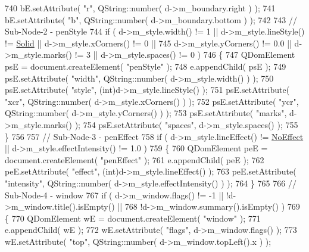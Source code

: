 \begin{DoxyCode}
740     bE.setAttribute( \textcolor{stringliteral}{"r"}, QString::number( d->m\_boundary.right ) );
741     bE.setAttribute( \textcolor{stringliteral}{"b"}, QString::number( d->m\_boundary.bottom ) );
742 
743     \textcolor{comment}{// Sub-Node-2 - penStyle}
744     \textcolor{keywordflow}{if} ( d->m\_style.width() != 1 || d->m\_style.lineStyle() != \hyperlink{classOkular_1_1Annotation_ac60f5de2d449043f9f849f3f081f8a7aabd593eeaf0fb9140018ea50a9d0bb80b}{Solid} || d->m\_style.xCorners() != 0 ||
745          d->m\_style.yCorners() != 0.0 || d->m\_style.marks() != 3 || d->m\_style.spaces() != 0 )
746     \{
747         QDomElement psE = document.createElement( \textcolor{stringliteral}{"penStyle"} );
748         e.appendChild( psE );
749         psE.setAttribute( \textcolor{stringliteral}{"width"}, QString::number( d->m\_style.width() ) );
750         psE.setAttribute( \textcolor{stringliteral}{"style"}, (\textcolor{keywordtype}{int})d->m\_style.lineStyle() );
751         psE.setAttribute( \textcolor{stringliteral}{"xcr"}, QString::number( d->m\_style.xCorners() ) );
752         psE.setAttribute( \textcolor{stringliteral}{"ycr"}, QString::number( d->m\_style.yCorners() ) );
753         psE.setAttribute( \textcolor{stringliteral}{"marks"}, d->m\_style.marks() );
754         psE.setAttribute( \textcolor{stringliteral}{"spaces"}, d->m\_style.spaces() );
755     \}
756 
757     \textcolor{comment}{// Sub-Node-3 - penEffect}
758     \textcolor{keywordflow}{if} ( d->m\_style.lineEffect() != \hyperlink{classOkular_1_1Annotation_a9083f89e7bb24e972852685dd2c6176eaf13ac621a84f14cf6dbb465c4fd73c1b}{NoEffect} || d->m\_style.effectIntensity() != 1.0 )
759     \{
760         QDomElement peE = document.createElement( \textcolor{stringliteral}{"penEffect"} );
761         e.appendChild( peE );
762         peE.setAttribute( \textcolor{stringliteral}{"effect"}, (\textcolor{keywordtype}{int})d->m\_style.lineEffect() );
763         peE.setAttribute( \textcolor{stringliteral}{"intensity"}, QString::number( d->m\_style.effectIntensity() ) );
764     \}
765 
766     \textcolor{comment}{// Sub-Node-4 - window}
767     \textcolor{keywordflow}{if} ( d->m\_window.flags() != -1 || !d->m\_window.title().isEmpty() ||
768          !d->m\_window.summary().isEmpty() )
769     \{
770         QDomElement wE = document.createElement( \textcolor{stringliteral}{"window"} );
771         e.appendChild( wE );
772         wE.setAttribute( \textcolor{stringliteral}{"flags"}, d->m\_window.flags() );
773         wE.setAttribute( \textcolor{stringliteral}{"top"}, QString::number( d->m\_window.topLeft().x ) );

\end{DoxyCode}
